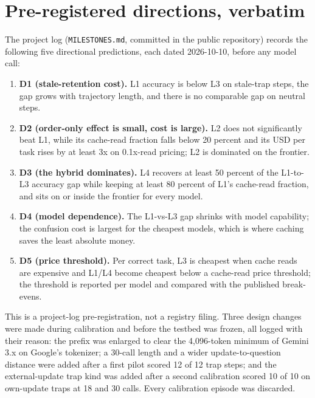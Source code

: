 \appendix
\clearpage
\FloatBarrier
\section{Pre-registered directions, verbatim}
\label{app:prereg}
The project log (\texttt{MILESTONES.md}, committed in the public repository) records the following five directional predictions, each dated 2026-10-10, before any model call:
\begin{enumerate}
\item \textbf{D1 (stale-retention cost).} L1 accuracy is below L3 on stale-trap steps, the gap grows with trajectory length, and there is no comparable gap on neutral steps.
\item \textbf{D2 (order-only effect is small, cost is large).} L2 does not significantly beat L1, while its cache-read fraction falls below 20 percent and its USD per task rises by at least 3x on 0.1x-read pricing; L2 is dominated on the frontier.
\item \textbf{D3 (the hybrid dominates).} L4 recovers at least 50 percent of the L1-to-L3 accuracy gap while keeping at least 80 percent of L1's cache-read fraction, and sits on or inside the frontier for every model.
\item \textbf{D4 (model dependence).} The L1-vs-L3 gap shrinks with model capability; the confusion cost is largest for the cheapest models, which is where caching saves the least absolute money.
\item \textbf{D5 (price threshold).} Per correct task, L3 is cheapest when cache reads are expensive and L1/L4 become cheapest below a cache-read price threshold; the threshold is reported per model and compared with the published break-evens.
\end{enumerate}
This is a project-log pre-registration, not a registry filing. Three design changes were made during calibration and before the testbed was frozen, all logged with their reason: the prefix was enlarged to clear the 4,096-token minimum of Gemini 3.x on Google's tokenizer; a 30-call length and a wider update-to-question distance were added after a first pilot scored 12 of 12 trap steps; and the external-update trap kind was added after a second calibration scored 10 of 10 on own-update traps at 18 and 30 calls. Every calibration episode was discarded.

\FloatBarrier
